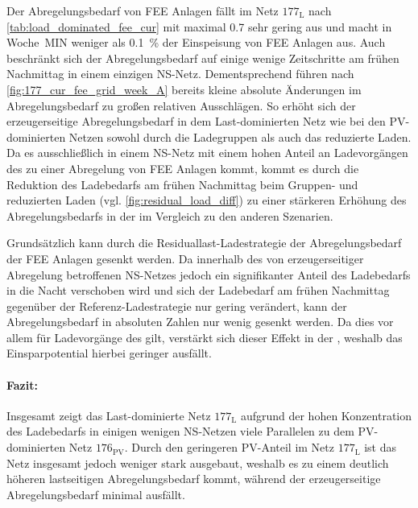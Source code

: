 Der Abregelungsbedarf von \gls{FEE} Anlagen fällt im Netz \(177_{\text{L}}\) nach \autoref{tab:load_dominated_fee_cur} mit maximal \SI{0.7}{\mwh} sehr gering aus und macht in Woche~MIN weniger als \SI{0.1}{\percent} der Einspeisung von \gls{FEE} Anlagen aus.
Auch beschränkt sich der Abregelungsbedarf auf einige wenige Zeitschritte am frühen Nachmittag in einem einzigen \gls{NS}-Netz.
Dementsprechend führen nach \autoref{fig:177_cur_fee_grid_week_A} bereits kleine absolute Änderungen im Abregelungsbedarf zu großen relativen Ausschlägen.
So erhöht sich der erzeugerseitige Abregelungsbedarf in dem Last-dominierten Netz wie bei den \gls{PV}-dominierten Netzen sowohl durch die Ladegruppen als auch das reduzierte Laden.
Da es ausschließlich in einem \gls{NS}-Netz mit einem hohen Anteil an Ladevorgängen des \UC \zH zu einer Abregelung von \gls{FEE} Anlagen kommt, kommt es durch die Reduktion des Ladebedarfs am frühen Nachmittag beim Gruppen- und reduzierten Laden (vgl. \autoref{fig:residual_load_diff}) zu einer stärkeren Erhöhung des Abregelungsbedarfs in der \SzeFirmenparkplatz im Vergleich zu den anderen Szenarien.



Grundsätzlich kann durch die Residuallast-Ladestrategie der Abregelungsbedarf der \gls{FEE} Anlagen gesenkt werden.
Da innerhalb des von erzeugerseitiger Abregelung betroffenen \gls{NS}-Netzes jedoch ein signifikanter Anteil des Ladebedarfs in die Nacht verschoben wird und sich der Ladebedarf am frühen Nachmittag gegenüber der Referenz-Ladestrategie nur gering verändert, kann der Abregelungsbedarf in absoluten Zahlen nur wenig gesenkt werden.
Da dies vor allem für Ladevorgänge des \UC \zH gilt, verstärkt sich dieser Effekt in der \SzeFirmenparkplatzdot, weshalb das Einsparpotential hierbei geringer ausfällt.


\paragraph{Fazit:}

Insgesamt zeigt das Last-dominierte Netz \(177_{\text{L}}\) aufgrund der hohen Konzentration des Ladebedarfs in einigen wenigen \gls{NS}-Netzen viele Parallelen zu dem \gls{PV}-dominierten Netz \(176_{\text{PV}}\).
Durch den geringeren \gls{PV}-Anteil im Netz \(177_{\text{L}}\) ist das Netz insgesamt jedoch weniger stark ausgebaut, weshalb es zu einem deutlich höheren lastseitigen Abregelungsbedarf kommt, während der erzeugerseitige Abregelungsbedarf minimal ausfällt.\medskip

